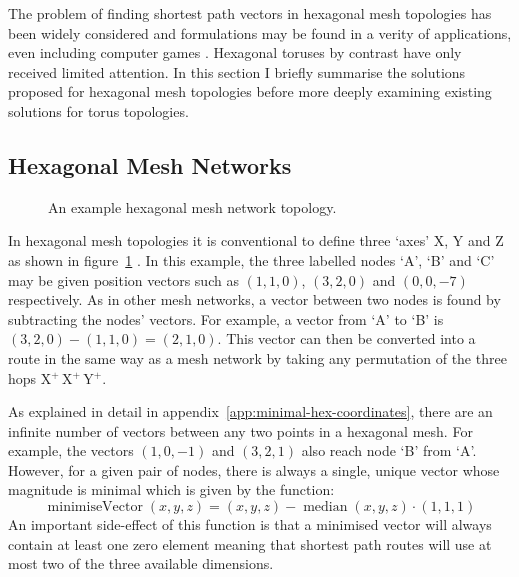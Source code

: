 		The problem of finding shortest path vectors in hexagonal mesh topologies
		has been widely considered and formulations may be found in a verity of
		applications, even including computer games \cite{patel15}. Hexagonal
		toruses by contrast have only received limited attention. In this section I
		briefly summarise the solutions proposed for hexagonal mesh topologies
		before more deeply examining existing solutions for torus topologies.
		
		\subsection{Hexagonal Mesh Networks}
			
			\begin{figure}
				\center
				\caption{An example hexagonal mesh network topology.}
				\label{fig:hex-mesh-topology-coordinates}
			\end{figure}
			
			In hexagonal mesh topologies it is conventional to define three `axes' X,
			Y and Z as shown in figure~\ref{fig:hex-mesh-topology-coordinates}
			\cite{patel15}. In this example, the three labelled nodes `A', `B' and
			`C' may be given position vectors such as $(1, 1, 0)$, $(3, 2, 0)$ and
			$(0, 0, -7)$ respectively. As in other mesh networks, a vector between
			two nodes is found by subtracting the nodes' vectors. For example, a
			vector from `A' to `B' is $(3, 2, 0) - (1, 1, 0) = (2, 1, 0)$. This
			vector can then be converted into a route in the same way as a mesh
			network by taking any permutation of the three hops  X$^+\,$X$^+\,$Y$^+$.
			
			As explained in detail in appendix~\ref{app:minimal-hex-coordinates},
			there are an infinite number of vectors between any two points in a
			hexagonal mesh. For example, the vectors $(1, 0, -1)$ and $(3, 2, 1)$
			also reach node `B' from `A'. However, for a given pair of nodes, there
			is always a single, unique vector whose magnitude is minimal which is
			given by the function:
			\begin{equation*} \operatorname{minimiseVector}(x,y,z) = (x,y,z) -
			\operatorname{median}(x,y,z) \cdot (1,1,1) \end{equation*}
			An important side-effect of this function is that a minimised vector will
			always contain at least one zero element meaning that shortest path
			routes will use at most two of the three available dimensions.
		
